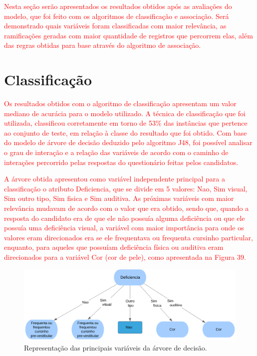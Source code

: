 \label{chapter:Resultados}

\par
\textcolor{red}{Nesta seção serão apresentados os resultados obtidos após as avaliações do modelo, que foi feito com os algoritmos de classificação e associação. Será demonstrado quais variáveis foram classificadas com maior relevância, as ramificações geradas com maior quantidade de registros que percorrem elas, além das regras obtidas para base através do algoritmo de associação.}

\section{Classificação}

\par
\textcolor{red}{Os resultados obtidos com o algoritmo de classificação apresentam um valor mediano de acurácia para o modelo utilizado. A técnica de classificação que foi utilizada, classificou corretamente em torno de 53\% das instâncias que pertence ao conjunto de teste, em relação à classe do resultado que foi obtido. Com base do modelo de árvore de decisão deduzido pelo algoritmo J48, foi possível analisar o grau de interação e a relação das variáveis de acordo com o caminho de interações percorrido pelas respostas do questionário feitas pelos candidatos.}

\par
\textcolor{red}{A árvore obtida apresentou como variável independente principal para a classificação o atributo Deficiencia, que se divide em 5 valores: Nao, Sim visual, Sim outro tipo, Sim fisica e Sim auditiva. As próximas variáveis com maior relevância mudavam de acordo com o valor que era obtido, sendo que, quando a resposta do candidato era de que ele não possuía alguma deficiência ou que ele possuía uma deficiência visual, a variável com maior importância para onde os valores eram direcionados era se ele frequentava ou frequenta cursinho particular, enquanto, para aqueles que possuíam deficiência física ou auditiva eram direcionados para a variável Cor (cor de pele), como apresentada na Figura 39.}

\par
\begin{figure}[!htp]
	\begin{center}
    \caption{\label{fig:waveform_fig} Representação das principais variáveis da árvore de decisão.}
	\includegraphics[scale=0.57]{Figuras/Arvore_gerada_grau2.png}
	\end{center}
\end{figure}


